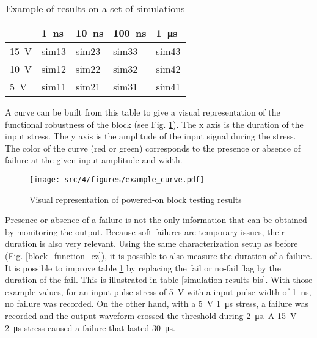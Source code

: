 \begin{table}[!h]
\centering
\begin{tabular}{@{}lllll@{}}
\toprule
               & \SI{1}{\nano\second}         & \SI{10}{\nano\second}        & \SI{100}{\nano\second}       & \SI{1}{\micro\second}        \\ \midrule
\SI{15}{\volt} & {\color[HTML]{FE0000} sim13} & {\color[HTML]{FE0000} sim23} & {\color[HTML]{FE0000} sim33} & {\color[HTML]{FE0000} sim43} \\
\SI{10}{\volt} & {\color[HTML]{32CB00} sim12} & {\color[HTML]{FE0000} sim22} & {\color[HTML]{FE0000} sim32} & {\color[HTML]{FE0000} sim42} \\
\SI{5}{\volt}  & {\color[HTML]{32CB00} sim11} & {\color[HTML]{32CB00} sim21} & {\color[HTML]{32CB00} sim31} & {\color[HTML]{FE0000} sim41} \\
\bottomrule
\end{tabular}
\caption{Example of results on a set of simulations}
\label{simulation-results}
\end{table}

A curve can be built from this table to give a visual representation of the functional robustness of the block (see Fig. \ref{wb_cz_curve_example}).
The x axis is the duration of the input stress.
The y axis is the amplitude of the input signal during the stress.
The color of the curve (red or green) corresponds to the presence or absence of failure at the given input amplitude and width.

\begin{figure}[!h]
  \centering
  \texttt{[image: src/4/figures/example\_curve.pdf]}
  \caption{Visual representation of powered-on block testing results}
  \label{wb_cz_curve_example}
\end{figure}

Presence or absence of a failure is not the only information that can be obtained by monitoring the output.
Because soft-failures are temporary issues, their duration is also very relevant.
Using the same characterization setup as before (Fig. \ref{block_function_cz}), it is possible to also measure the duration of a failure.
It is possible to improve table \ref{simulation-results} by replacing the fail or no-fail flag by the duration of the fail.
This is illustrated in table \ref{simulation-results-bis}.
With those example values, for an input pulse stress of \SI{5}{\volt} with a input pulse width of \SI{1}{\nano\second}, no failure was recorded.
On the other hand, with a \SI{5}{\volt} \SI{1}{\micro\second} stress, a failure was recorded and the output waveform crossed the threshold during \SI{2}{\micro\second}.
A \SI{15}{\volt} \SI{2}{\micro\second} stress caused a failure that lasted \SI{30}{\micro\second}.

